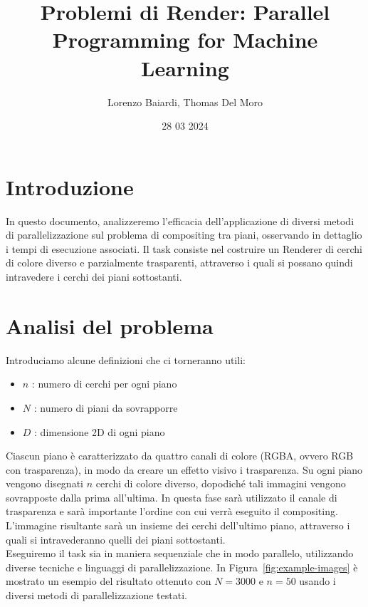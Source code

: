 \documentclass[11pt]{article}
\title{Problemi di Render: Parallel Programming for Machine Learning}
\author{Lorenzo Baiardi, Thomas Del Moro}
\date{28 03 2024}
\begin{document}
    \maketitle

    \section{Introduzione}\label{sec:introduzione}
    In questo documento, analizzeremo l'efficacia dell'applicazione di diversi metodi di parallelizzazione
    sul problema di compositing tra piani, osservando in dettaglio i tempi di esecuzione associati.
    Il task consiste nel costruire un Renderer di cerchi di colore diverso e parzialmente trasparenti,
    attraverso i quali si possano quindi intravedere i cerchi dei piani sottostanti.

    \section{Analisi del problema}\label{sec:analisi-del-problema}
    Introduciamo alcune definizioni che ci torneranno utili:
    \begin{itemize}
        \item $n$ : numero di cerchi per ogni piano
        \item $N$ : numero di piani da sovrapporre
        \item $D$ : dimensione 2D di ogni piano
    \end{itemize}
    Ciascun piano è caratterizzato da quattro canali di colore (RGBA, ovvero RGB con trasparenza),
    in modo da creare un effetto visivo i trasparenza.
    Su ogni piano vengono disegnati $n$ cerchi di colore diverso, dopodiché tali immagini vengono sovrapposte dalla
    prima all'ultima.
    In questa fase sarà utilizzato il canale di trasparenza e sarà importante l'ordine con cui verrà eseguito il compositing.
    L'immagine risultante sarà un insieme dei cerchi dell'ultimo piano, attraverso i quali si intravederanno quelli
    dei piani sottostanti.\\

    Eseguiremo il task sia in maniera sequenziale che in modo parallelo, utilizzando diverse tecniche e linguaggi di parallelizzazione.
    In Figura~\ref{fig:example-images} è mostrato un esempio del risultato ottenuto con $N=3000$ e $n=50$ usando i
    diversi metodi di parallelizzazione testati.
\end{document}
